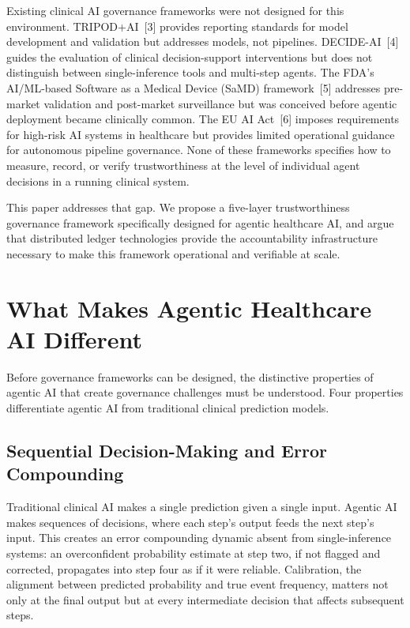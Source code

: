 Existing clinical AI governance frameworks were not designed for this
environment. TRIPOD+AI~{[}3{]} provides reporting standards for model
development and validation but addresses models, not pipelines.
DECIDE-AI~{[}4{]} guides the evaluation of clinical decision-support
interventions but does not distinguish between single-inference tools
and multi-step agents. The FDA's AI/ML-based Software as a Medical
Device (SaMD) framework~{[}5{]} addresses pre-market validation and
post-market surveillance but was conceived before agentic deployment
became clinically common. The EU AI Act~{[}6{]} imposes requirements for
high-risk AI systems in healthcare but provides limited operational
guidance for autonomous pipeline governance. None of these frameworks
specifies how to measure, record, or verify trustworthiness at the level
of individual agent decisions in a running clinical system.

This paper addresses that gap. We propose a five-layer trustworthiness
governance framework specifically designed for agentic healthcare AI,
and argue that distributed ledger technologies provide the
accountability infrastructure necessary to make this framework
operational and verifiable at scale.


\section{What Makes Agentic Healthcare AI
Different}\label{what-makes-agentic-healthcare-ai-different}

Before governance frameworks can be designed, the distinctive properties
of agentic AI that create governance challenges must be understood. Four
properties differentiate agentic AI from traditional clinical prediction
models.

\subsection{Sequential Decision-Making and Error
Compounding}\label{sequential-decision-making-and-error-compounding}

Traditional clinical AI makes a single prediction given a single input.
Agentic AI makes sequences of decisions, where each step's output feeds
the next step's input. This creates an error compounding dynamic absent
from single-inference systems: an overconfident probability estimate at
step two, if not flagged and corrected, propagates into step four as if
it were reliable. Calibration, the alignment between predicted
probability and true event frequency, matters not only at the final
output but at every intermediate decision that affects subsequent steps.

